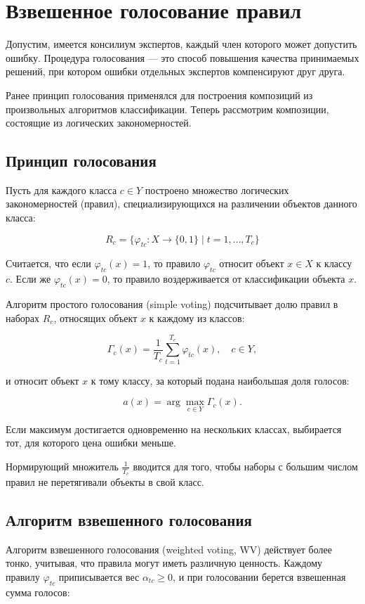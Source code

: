 \section{Взвешенное голосование правил}

Допустим, имеется консилиум экспертов, каждый член которого может допустить ошибку. Процедура голосования — это способ повышения качества принимаемых решений, при котором ошибки отдельных экспертов компенсируют друг друга.

Ранее принцип голосования применялся для построения композиций из произвольных алгоритмов классификации. Теперь рассмотрим композиции, состоящие из логических закономерностей.

\subsection{Принцип голосования}

Пусть для каждого класса $c \in Y$ построено множество логических закономерностей (правил), специализирующихся на различении объектов данного класса:

\[
R_c = \{ \varphi_{tc} : X \to \{0, 1\} \mid t = 1, \dots, T_c \}
\]

Считается, что если $\varphi_{tc}(x) = 1$, то правило $\varphi_{tc}$ относит объект $x \in X$ к классу $c$. Если же $\varphi_{tc}(x) = 0$, то правило воздерживается от классификации объекта $x$.

Алгоритм простого голосования (simple voting) подсчитывает долю правил в наборах $R_c$, относящих объект $x$ к каждому из классов:

\[
\Gamma_c(x) = \frac{1}{T_c} \sum_{t=1}^{T_c} \varphi_{tc}(x), \quad c \in Y,
\]

и относит объект $x$ к тому классу, за который подана наибольшая доля голосов:

\[
a(x) = \arg \max_{c \in Y} \Gamma_c(x).
\]

Если максимум достигается одновременно на нескольких классах, выбирается тот, для которого цена ошибки меньше.

Нормирующий множитель $\frac{1}{T_c}$ вводится для того, чтобы наборы с большим числом правил не перетягивали объекты в свой класс.

\subsection{Алгоритм взвешенного голосования}
Алгоритм взвешенного голосования (weighted voting, WV) действует более тонко, учитывая, что правила могут иметь различную ценность. Каждому правилу $\varphi_{tc}$ приписывается вес $\alpha_{tc} \geq 0$, и при голосовании берется взвешенная сумма голосов:

